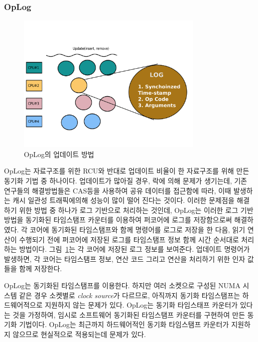 \subsubsection{OpLog}

\begin{figure}[h]
    \centering
    \includegraphics[width=0.8\textwidth]{fig/oplog_log}
    \caption{OpLog의 업데이트 방법}
  \label{fig:oplog}
\end{figure}

OpLog는  자료구조를 위한 RCU와 반대로 업데이트 비율이  한 
자료구조를 위해 만든 동기화 기법 중 하나이다.
업데이트가 많아질 경우, 락에 의해 문제가 생기는데, 기존 연구들의 해결방법들은 
CAS등을 사용하여 공유 데이터를 접근함에 따라, 이때 발생하는 캐시 일관성 트래픽에의해 
성능이 많이 떨어 진다는 것이다.
이러한 문제점을 해결하기 위한 방법 중 하나가 로그 기반으로 처리하는 것인데, OpLog는 이러한 로그 기반 
방법을 동기화된 타임스탬프 카운터를 이용하여 퍼코어에 로그를 저장함으로써 해결하였다. 
각 코어에 동기화된 타임스탬프와 함께 명령어를 로그로 저장을 한 다음, 읽기 연산이 수행되기 전에 
퍼코어에 저장된 로그를 타임스탬프 정보 함께 시간 순서대로 처리하는 방법이다.
그림~\ref{fig:oplog}는 각 코어에 저장된 로그 정보를 보여준다.
업데이트 명령어가 발생하면, 각 코어는 타임스탬프 정보, 연산 코드 그리고 연산을 처리하기 위한 
인자 값들을 함께 저장한다.

OpLog는 동기화된 타임스탬프를 이용한다. 
하지만 여러 소켓으로 구성된 NUMA 시스템 같은 경우 소켓별로 \textit{clock source}가 다르므로, 
아직까지 동기화 타임스탬프는 하드웨어적으로 지원하지 않는 문제가 있다.
OpLog는 동기화 타임스태프 카운터가 있다는 것을 가정하여, 임시로 소프트웨어 동기화된 
타임스탬프 카운터를 구현하여 만든 동기화 기법이다. 
OpLog는 최근까지 하드웨어적인 동기화 타임스탬프 카운터가 지원하지 않으므로 
현실적으로 적용되는데 문제가 있다.


